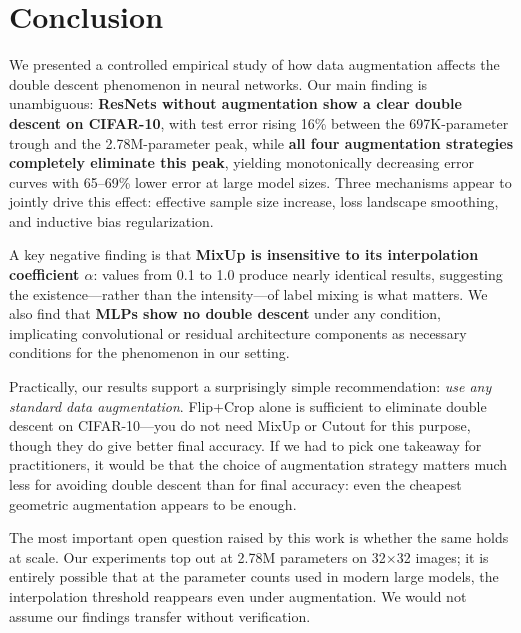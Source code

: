 \section{Conclusion}

We presented a controlled empirical study of how data augmentation affects the double descent phenomenon in neural networks. Our main finding is unambiguous: \textbf{ResNets without augmentation show a clear double descent on CIFAR-10}, with test error rising 16\% between the 697K-parameter trough and the 2.78M-parameter peak, while \textbf{all four augmentation strategies completely eliminate this peak}, yielding monotonically decreasing error curves with 65--69\% lower error at large model sizes. Three mechanisms appear to jointly drive this effect: effective sample size increase, loss landscape smoothing, and inductive bias regularization.

A key negative finding is that \textbf{MixUp is insensitive to its interpolation coefficient $\alpha$}: values from 0.1 to 1.0 produce nearly identical results, suggesting the existence---rather than the intensity---of label mixing is what matters. We also find that \textbf{MLPs show no double descent} under any condition, implicating convolutional or residual architecture components as necessary conditions for the phenomenon in our setting.

Practically, our results support a surprisingly simple recommendation: \emph{use any standard data augmentation}. Flip+Crop alone is sufficient to eliminate double descent on CIFAR-10---you do not need MixUp or Cutout for this purpose, though they do give better final accuracy. If we had to pick one takeaway for practitioners, it would be that the choice of augmentation strategy matters much less for avoiding double descent than for final accuracy: even the cheapest geometric augmentation appears to be enough.

The most important open question raised by this work is whether the same holds at scale. Our experiments top out at 2.78M parameters on 32$\times$32 images; it is entirely possible that at the parameter counts used in modern large models, the interpolation threshold reappears even under augmentation. We would not assume our findings transfer without verification.
